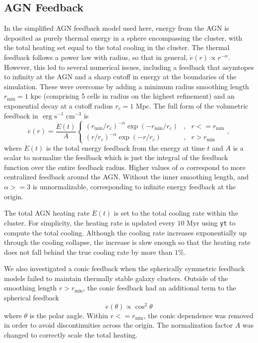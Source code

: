 \documentclass[iop,apjl, twocolappendix]{emulateapj}   %
\begin{document}
\subsection{AGN Feedback}
\label{sec:AGN_feedback}

In the simplified AGN feedback model used here, energy from the AGN is
deposited as purely thermal energy in a sphere encompassing the cluster, with
the total heating set equal to the total cooling in the cluster. The thermal
feedback follows a power law with radius, so that in general, $\dot{e} (r)
\propto r^{-\alpha}$. However, this led to several numerical issues, including
a feedback that asymtopes to infinity at the AGN and a sharp cutoff in energy
at the boundaries of the simulation. These were overcome by adding a minimum
radius smoothing length $r_{\text{min}} = 1 \text{ kpc}$ (comprising 5 cells in
radius on the highest refinement) and an exponential decay at a cutoff radius
$r_c = 1 \text{ Mpc}.$ The full form of the volumetric feedback in $\text{ erg}
\text{ s}^{-1} \text{ cm}^{-3}$ is
\begin{equation}
  \dot{e}(r) = \frac{\dot{E}(t)}{A}
  \left\{\begin{matrix}
    \left( r_{\text{min}}/r_c \right )^{-\alpha} \exp {\left ( -r_{\text{min}}/r_c \right )} & , &r <= r_{\text{min}} \\
    \left( r /r_c \right )^{-\alpha} \exp { \left ( -r/r_c \right )}                         & , &r >  r_{\text{min}}
  \end{matrix}\right.,
\end{equation}
where $\dot{E}(t)$ is the total energy feedback from the energy at time $t$ and
$A$ is a scalar to normalize the feedback which is just the integral of the
feedback function over the entire feedback radius. Higher values of $\alpha$
correspond to more centralized feedback around the AGN. Without the inner
smoothing length, and $\alpha >= 3$ is unnormalizable, corresponding to
infinite energy feedback at the origin.

The total AGN heating rate $\dot E(t)$ is set to the total cooling rate within
the cluster. For simplicity, the heating rate is updated every $10 \text{ Myr}$
using \texttt{yt} to compute the total cooling. Although the cooling rate
increases exponentially up through the cooling collapse, the increase is slow
enough so that the heating rate does not fall behind the true cooling rate by
more than $1\%$.

We also investigated a conic feedback when the spherically symmetric feedback
models failed to maintain thermally stable galaxy clusters. Outside of the
smoothing length $r > r_{\text{min}}$, the conic feedback had an additional
term to the spherical feedback
\begin{equation}
	\dot{e}(\theta) \propto \cos^2 \theta 
\end{equation}
where $\theta$ is the polar angle. Within $r <= r_{\text{min}}$, the conic
dependence was removed in order to avoid discontinuities across the origin. The
normalization factor $A$ was changed to correctly scale the total heating.
\end{document}
